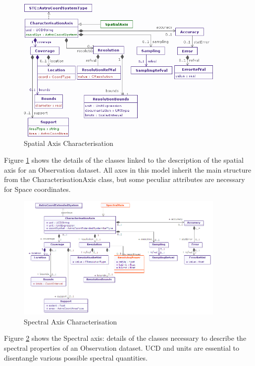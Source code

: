 \documentclass[11pt,a4paper]{ivoa}
\begin{document}
\begin{figure}[H]
\centering
\includegraphics[width=0.9\textwidth]{Char-Spatial.png}
\caption{Spatial Axis Characterisation}
\label{fig:char-spatial}
\end{figure}
Figure \ref{fig:char-spatial} shows the details of the classes linked to the description of the
spatial axis for an Observation dataset. All axes in this model inherit the main structure from the
CharacterisationAxis class, but some peculiar attributes are necessary for Space coordinates.

\begin{figure}[H]
\centering
\includegraphics[width=0.9\textwidth]{Char-Spectral.png}
\caption{Spectral Axis Characterisation}
\label{fig:char-spectral}
\end{figure}
Figure \ref{fig:char-spectral} shows the Spectral axis: details of the classes necessary to
describe the spectral properties of an Observation dataset. UCD and units are essential to disentangle various possible
spectral quantities.
\end{document}
